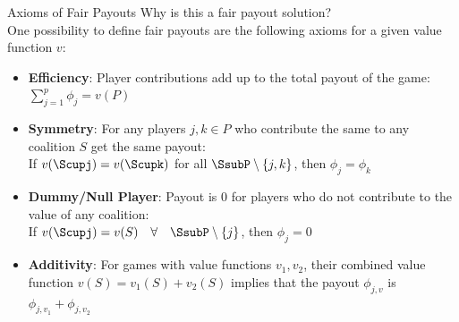 \documentclass[11pt,compress,t,notes=noshow, aspectratio=169, xcolor=table]{beamer}
\begin{document}
\begin{frame}{Axioms of Fair Payouts}
 Why is this a fair payout solution?
 \\
 One possibility to define fair payouts are the following axioms for a given value function $v$:
  \vspace{0.25cm}
  \begin{itemize}[<+->]
  \itemsep1em
    \item \textbf{Efficiency}: Player contributions add up to the total payout of the game:
      $\sum\nolimits_{j=1}^p\phi_j = v(P)$
    \item \textbf{Symmetry}: For any players $j,k \in P$ who contribute the same to any coalition $S$ get the same payout: \\ 
      If $v(\Scupj) = v(\Scupk)$ for all $\SsubP \setminus\{j,k\}$, then $\phi_j=\phi_k$
    \item \textbf{Dummy/Null Player}: Payout is 0 for players who do not contribute to the value of any coalition: \\
      If $v(\Scupj)=v(S)\quad  \forall \quad \SsubP \setminus \{j\}$, then $\phi_j=0$
    \item \textbf{Additivity}: For games with value functions $v_1, v_2$, their combined value function $v(S) = v_1(S) + v_2(S)$ implies that the payout $\phi_{j,v}$ is $\phi_{j,v_1} + \phi_{j, v_2}$
  \end{itemize}
  \vspace{0.5cm}
  

\end{frame}



      

  
\end{document}

